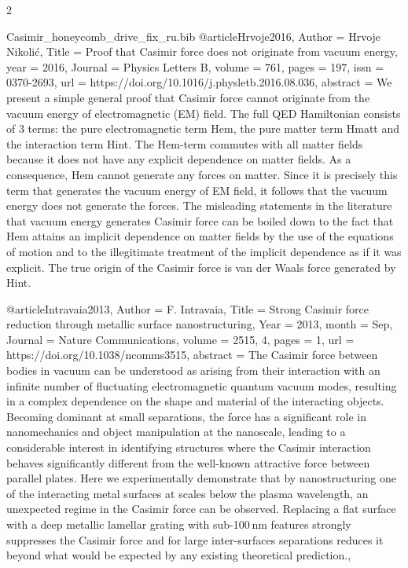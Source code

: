 \documentclass[twoside, 10pt]{article}
\def\myfilename{Casimir_honeycomb_drive_fix_ru}
\begin{document}
\begin{multicols}{2}
\begin{filecontents}{\myfilename.bib}
@article{Hrvoje2016,
    Author = {Hrvoje Nikolić},
    Title = {Proof that Casimir force does not originate from vacuum energy},
    year = {2016},
    Journal = {Physics Letters B},
    volume = {761},
    pages = {197},
    issn = {0370-2693},
    url = {https://doi.org/10.1016/j.physletb.2016.08.036},
    abstract = {We present a simple general proof that Casimir force cannot originate from the vacuum energy of electromagnetic (EM) field. The full QED Hamiltonian consists of 3 terms: the pure electromagnetic term Hem, the pure matter term Hmatt and the interaction term Hint. The Hem-term commutes with all matter fields because it does not have any explicit dependence on matter fields. As a consequence, Hem cannot generate any forces on matter. Since it is precisely this term that generates the vacuum energy of EM field, it follows that the vacuum energy does not generate the forces. The misleading statements in the literature that vacuum energy generates Casimir force can be boiled down to the fact that Hem attains an implicit dependence on matter fields by the use of the equations of motion and to the illegitimate treatment of the implicit dependence as if it was explicit. The true origin of the Casimir force is van der Waals force generated by Hint.}
}




@article{Intravaia2013,
    Author = {F. Intravaia},
    Title = {Strong Casimir force reduction through metallic surface nanostructuring},
    Year = {2013},
    month = {Sep},
    Journal = {Nature Communications},
    volume = {2515, 4},
    pages = {1},
    url = {https://doi.org/10.1038/ncomms3515},
    abstract = {The Casimir force between bodies in vacuum can be understood as arising from their interaction with an infinite number of fluctuating electromagnetic quantum vacuum modes, resulting in a complex dependence on the shape and material of the interacting objects. Becoming dominant at small separations, the force has a significant role in nanomechanics and object manipulation at the nanoscale, leading to a considerable interest in identifying structures where the Casimir interaction behaves significantly different from the well-known attractive force between parallel plates. Here we experimentally demonstrate that by nanostructuring one of the interacting metal surfaces at scales below the plasma wavelength, an unexpected regime in the Casimir force can be observed. Replacing a flat surface with a deep metallic lamellar grating with sub-100 nm features strongly suppresses the Casimir force and for large inter-surfaces separations reduces it beyond what would be expected by any existing theoretical prediction.},
}


\end{filecontents}
\end{multicols}
\end{document}
